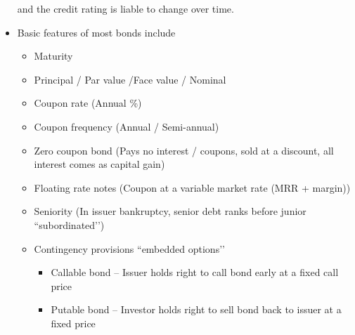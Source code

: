 \documentclass[../notes_compiled.tex]{subfiles}
\begin{document}
\begin{itemize}
and the credit rating is liable to change over time.


\item Basic features of most bonds include
\begin{itemize}
\item Maturity
\item Principal / Par value /Face value / Nominal
\item Coupon rate (Annual \%)
\item Coupon frequency (Annual / Semi-annual)
\item Zero coupon bond (Pays no interest / coupons, sold at a discount, all interest comes as capital gain)
\item Floating rate notes (Coupon at a variable market rate (MRR + margin))
\item Seniority (In issuer bankruptcy, senior debt ranks before junior ``subordinated’’)
\item Contingency provisions ``embedded options’’
\begin{itemize}
\item Callable bond -- Issuer holds right to call bond early at a fixed call price
\item Putable bond -- Investor holds right to sell bond back to issuer at a fixed price
\end{itemize}
\end{itemize}
\end{itemize}
\end{document}
